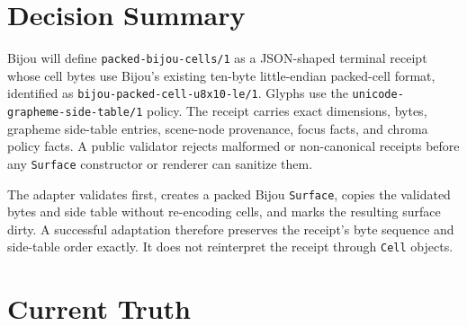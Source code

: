 \section{Decision Summary}\label{record-164-decision-summary}

Bijou will define \texttt{p\allowbreak{}a\allowbreak{}c\allowbreak{}k\allowbreak{}e\allowbreak{}d\allowbreak{}-\allowbreak{}b\allowbreak{}i\allowbreak{}j\allowbreak{}o\allowbreak{}u\allowbreak{}-\allowbreak{}c\allowbreak{}e\allowbreak{}l\allowbreak{}l\allowbreak{}s\allowbreak{}/\allowbreak{}1} as a JSON-shaped terminal receipt whose cell bytes use Bijou's existing ten-byte little-endian packed-cell format, identified as \texttt{b\allowbreak{}i\allowbreak{}j\allowbreak{}o\allowbreak{}u\allowbreak{}-\allowbreak{}p\allowbreak{}a\allowbreak{}c\allowbreak{}k\allowbreak{}e\allowbreak{}d\allowbreak{}-\allowbreak{}c\allowbreak{}e\allowbreak{}l\allowbreak{}l\allowbreak{}-\allowbreak{}u\allowbreak{}8\allowbreak{}x\allowbreak{}1\allowbreak{}0\allowbreak{}-\allowbreak{}l\allowbreak{}e\allowbreak{}/\allowbreak{}1}. Glyphs use the \texttt{u\allowbreak{}n\allowbreak{}i\allowbreak{}c\allowbreak{}o\allowbreak{}d\allowbreak{}e\allowbreak{}-\allowbreak{}g\allowbreak{}r\allowbreak{}a\allowbreak{}p\allowbreak{}h\allowbreak{}e\allowbreak{}m\allowbreak{}e\allowbreak{}-\allowbreak{}s\allowbreak{}i\allowbreak{}d\allowbreak{}e\allowbreak{}-\allowbreak{}t\allowbreak{}a\allowbreak{}b\allowbreak{}l\allowbreak{}e\allowbreak{}/\allowbreak{}1} policy. The receipt carries exact dimensions, bytes, grapheme side-table entries, scene-node provenance, focus facts, and chroma policy facts. A public validator rejects malformed or non-canonical receipts before any \texttt{S\allowbreak{}u\allowbreak{}r\allowbreak{}f\allowbreak{}a\allowbreak{}c\allowbreak{}e} constructor or renderer can sanitize them.

The adapter validates first, creates a packed Bijou \texttt{S\allowbreak{}u\allowbreak{}r\allowbreak{}f\allowbreak{}a\allowbreak{}c\allowbreak{}e}, copies the validated bytes and side table without re-encoding cells, and marks the resulting surface dirty. A successful adaptation therefore preserves the receipt's byte sequence and side-table order exactly. It does not reinterpret the receipt through \texttt{C\allowbreak{}e\allowbreak{}l\allowbreak{}l} objects.

\section{Current Truth}\label{record-164-current-truth}

